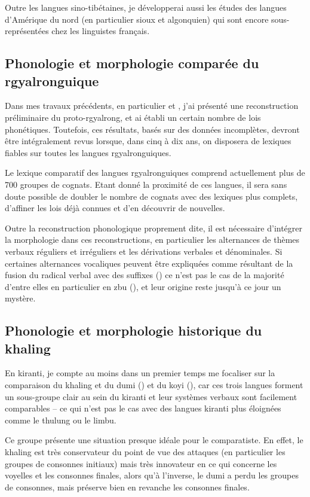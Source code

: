 \documentclass[oldfontcommands,oneside,a4paper,11pt]{article}
\begin{document}
Outre les langues sino-tibétaines, je développerai aussi les études des langues d'Amérique du nord (en particulier sioux et algonquien) qui sont encore sous-représentées chez les linguistes français.

\subsection{Phonologie et morphologie comparée du rgyalronguique} \label{sec:comparee.rgy}
Dans mes travaux précédents, en particulier \citet{jacques04these} et \citet{jacques14esquisse}, j'ai présenté une reconstruction préliminaire du proto-rgyalrong, et ai établi un certain nombre de lois phonétiques. Toutefois, ces résultats, basés sur des données incomplètes, devront être intégralement revus lorsque, dans cinq à dix ans, on disposera de lexiques fiables sur toutes les langues rgyalronguiques.

Le lexique comparatif des langues rgyalronguiques comprend actuellement plus de 700 groupes de cognats. Etant donné la proximité de ces langues, il sera sans doute possible de doubler le nombre de cognats avec des lexiques plus complets,  d'affiner les lois déjà connues et d'en découvrir de nouvelles. 

Outre la reconstruction phonologique proprement dite, il est nécessaire d'intégrer la morphologie dans ces reconstructions, en particulier les alternances de thèmes verbaux réguliers et irréguliers et les dérivations verbales et dénominales. Si certaines alternances vocaliques peuvent être expliquées comme résultant de la fusion du radical verbal avec des suffixes (\citealt[357-8]{jacques04these}) ce n'est pas le cas de la majorité d'entre elles en particulier en zbu (\citealt{jackson04showu}), et leur origine reste jusqu'à ce jour un mystère.

\subsection{Phonologie et morphologie historique du khaling}
En kiranti, je compte au moins dans un premier temps me focaliser sur la comparaison du khaling et du dumi (\citealt{driem93dumi}) et du koyi (\citealt{lahaussois09}), car ces trois langues forment un sous-groupe clair au sein du kiranti et leur systèmes verbaux sont facilement comparables -- ce qui n'est pas le cas avec des langues kiranti plus éloignées comme le thulung ou le limbu.

Ce groupe présente une situation presque idéale pour le comparatiste. En effet, le khaling est très conservateur du point de vue des attaques (en particulier les groupes de consonnes initiaux) mais très innovateur en ce qui concerne les voyelles et les consonnes finales, alors qu'à l'inverse, le dumi a perdu les groupes de consonnes, mais préserve bien en revanche les consonnes finales. 
\end{document}
